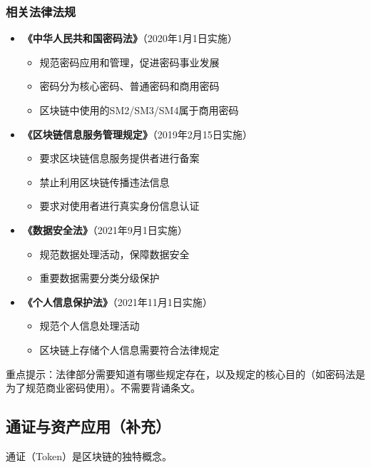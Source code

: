 ﻿\documentclass[12pt,a4paper]{article}
\begin{document}
\subsubsection{相关法律法规}

\begin{itemize}[leftmargin=1.5em]
\item \textbf{《中华人民共和国密码法》}（2020年1月1日实施）
  \begin{itemize}
  \item 规范密码应用和管理，促进密码事业发展
  \item 密码分为核心密码、普通密码和商用密码
  \item 区块链中使用的SM2/SM3/SM4属于商用密码
  \end{itemize}
\item \textbf{《区块链信息服务管理规定》}（2019年2月15日实施）
  \begin{itemize}
  \item 要求区块链信息服务提供者进行备案
  \item 禁止利用区块链传播违法信息
  \item 要求对使用者进行真实身份信息认证
  \end{itemize}
\item \textbf{《数据安全法》}（2021年9月1日实施）
  \begin{itemize}
  \item 规范数据处理活动，保障数据安全
  \item 重要数据需要分类分级保护
  \end{itemize}
\item \textbf{《个人信息保护法》}（2021年11月1日实施）
  \begin{itemize}
  \item 规范个人信息处理活动
  \item 区块链上存储个人信息需要符合法律规定
  \end{itemize}
\end{itemize}

\begin{exambox}
重点提示：法律部分需要知道有哪些规定存在，以及规定的核心目的（如密码法是为了规范商业密码使用）。不需要背诵条文。
\end{exambox}

\subsection{通证与资产应用（补充）}

通证（Token）是区块链的独特概念。
\end{document}
